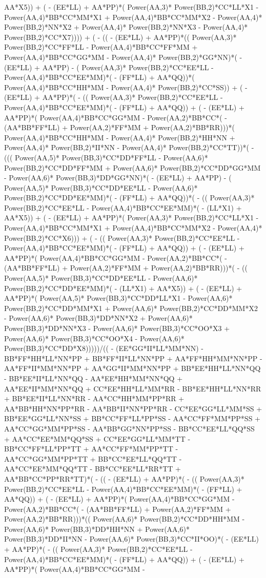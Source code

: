 \documentclass[10pt]{article} %
\begin{document}
AA*X5)) + ( - (EE*LL) + AA*PP)*( Power(AA,3)* Power(BB,2)*CC*LL*X1 -  Power(AA,4)*BB*CC*MM*X1 +  Power(AA,4)*BB*CC*MM*X2 -  Power(AA,4)* Power(BB,2)*NN*X2 +  Power(AA,4)* Power(BB,2)*NN*X3 -  Power(AA,4)* Power(BB,2)*CC*X7)))) + ( - (( - (EE*LL) + AA*PP)*(( Power(AA,3)* Power(BB,2)*CC*FF*LL -  Power(AA,4)*BB*CC*FF*MM +  Power(AA,4)*BB*CC*GG*MM -  Power(AA,4)* Power(BB,2)*GG*NN)*( - (EE*LL) + AA*PP) - ( Power(AA,3)* Power(BB,2)*CC*EE*LL -  Power(AA,4)*BB*CC*EE*MM)*( - (FF*LL) + AA*QQ))*( Power(AA,4)*BB*CC*HH*MM -  Power(AA,4)* Power(BB,2)*CC*SS)) + ( - (EE*LL) + AA*PP)*( - (( Power(AA,3)* Power(BB,2)*CC*EE*LL -  Power(AA,4)*BB*CC*EE*MM)*( - (FF*LL) + AA*QQ)) + ( - (EE*LL) + AA*PP)*( Power(AA,4)*BB*CC*GG*MM -  Power(AA,2)*BB*CC*( - (AA*BB*FF*LL) +  Power(AA,2)*FF*MM +  Power(AA,2)*BB*RR)))*( Power(AA,4)*BB*CC*HH*MM -  Power(AA,4)* Power(BB,2)*HH*NN +  Power(AA,4)* Power(BB,2)*II*NN -  Power(AA,4)* Power(BB,2)*CC*TT))*( - ((( Power(AA,5)* Power(BB,3)*CC*DD*FF*LL -  Power(AA,6)* Power(BB,2)*CC*DD*FF*MM +  Power(AA,6)* Power(BB,2)*CC*DD*GG*MM -  Power(AA,6)* Power(BB,3)*DD*GG*NN)*( - (EE*LL) + AA*PP) - ( Power(AA,5)* Power(BB,3)*CC*DD*EE*LL -  Power(AA,6)* Power(BB,2)*CC*DD*EE*MM)*( - (FF*LL) + AA*QQ))*( - (( Power(AA,3)* Power(BB,2)*CC*EE*LL -  Power(AA,4)*BB*CC*EE*MM)*( - (LL*X1) + AA*X5)) + ( - (EE*LL) + AA*PP)*( Power(AA,3)* Power(BB,2)*CC*LL*X1 -  Power(AA,4)*BB*CC*MM*X1 +  Power(AA,4)*BB*CC*MM*X2 -  Power(AA,4)* Power(BB,2)*CC*X6))) + ( - (( Power(AA,3)* Power(BB,2)*CC*EE*LL -  Power(AA,4)*BB*CC*EE*MM)*( - (FF*LL) + AA*QQ)) + ( - (EE*LL) + AA*PP)*( Power(AA,4)*BB*CC*GG*MM -  Power(AA,2)*BB*CC*( - (AA*BB*FF*LL) +  Power(AA,2)*FF*MM +  Power(AA,2)*BB*RR)))*( - (( Power(AA,5)* Power(BB,3)*CC*DD*EE*LL -  Power(AA,6)* Power(BB,2)*CC*DD*EE*MM)*( - (LL*X1) + AA*X5)) + ( - (EE*LL) + AA*PP)*( Power(AA,5)* Power(BB,3)*CC*DD*LL*X1 -  Power(AA,6)* Power(BB,2)*CC*DD*MM*X1 +  Power(AA,6)* Power(BB,2)*CC*DD*MM*X2 -  Power(AA,6)* Power(BB,3)*DD*NN*X2 +  Power(AA,6)* Power(BB,3)*DD*NN*X3 -  Power(AA,6)* Power(BB,3)*CC*OO*X3 +  Power(AA,6)* Power(BB,3)*CC*OO*X4 -  Power(AA,6)* Power(BB,3)*CC*DD*X8)))))/(( - (EE*GG*II*LL*MM*NN) - BB*FF*HH*LL*NN*PP + BB*FF*II*LL*NN*PP + AA*FF*HH*MM*NN*PP - AA*FF*II*MM*NN*PP + AA*GG*II*MM*NN*PP + BB*EE*HH*LL*NN*QQ - BB*EE*II*LL*NN*QQ - AA*EE*HH*MM*NN*QQ + AA*EE*II*MM*NN*QQ + CC*EE*HH*LL*MM*RR - BB*EE*HH*LL*NN*RR + BB*EE*II*LL*NN*RR - AA*CC*HH*MM*PP*RR + AA*BB*HH*NN*PP*RR - AA*BB*II*NN*PP*RR - CC*EE*GG*LL*MM*SS + BB*EE*GG*LL*NN*SS + BB*CC*FF*LL*PP*SS - AA*CC*FF*MM*PP*SS + AA*CC*GG*MM*PP*SS - AA*BB*GG*NN*PP*SS - BB*CC*EE*LL*QQ*SS + AA*CC*EE*MM*QQ*SS + CC*EE*GG*LL*MM*TT - BB*CC*FF*LL*PP*TT + AA*CC*FF*MM*PP*TT - AA*CC*GG*MM*PP*TT + BB*CC*EE*LL*QQ*TT - AA*CC*EE*MM*QQ*TT - BB*CC*EE*LL*RR*TT + AA*BB*CC*PP*RR*TT)*( - (( - (EE*LL) + AA*PP)*( - (( Power(AA,3)* Power(BB,2)*CC*EE*LL -  Power(AA,4)*BB*CC*EE*MM)*( - (FF*LL) + AA*QQ)) + ( - (EE*LL) + AA*PP)*( Power(AA,4)*BB*CC*GG*MM -  Power(AA,2)*BB*CC*( - (AA*BB*FF*LL) +  Power(AA,2)*FF*MM +  Power(AA,2)*BB*RR)))*(( Power(AA,6)* Power(BB,2)*CC*DD*HH*MM -  Power(AA,6)* Power(BB,3)*DD*HH*NN +  Power(AA,6)* Power(BB,3)*DD*II*NN -  Power(AA,6)* Power(BB,3)*CC*II*OO)*( - (EE*LL) + AA*PP)*( - (( Power(AA,3)* Power(BB,2)*CC*EE*LL -  Power(AA,4)*BB*CC*EE*MM)*( - (FF*LL) + AA*QQ)) + ( - (EE*LL) + AA*PP)*( Power(AA,4)*BB*CC*GG*MM -  
\end{document}
